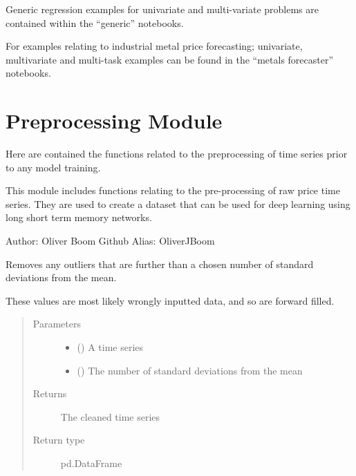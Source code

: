 \documentclass[letterpaper,10pt,english]{sphinxmanual}
\begin{document}
Generic regression examples for univariate and multi-variate problems are contained within the “generic” notebooks.

For examples relating to industrial metal price forecasting; univariate, multivariate and multi-task examples can be found in the “metals forecaster” notebooks.


\section{Preprocessing Module}
\label{\detokenize{preprocessing:preprocessing-module}}\label{\detokenize{preprocessing::doc}}
Here are contained the functions related to the preprocessing of time series prior to any model training.

\label{\detokenize{preprocessing:module-Foresight.preprocessing}}
This module includes functions relating to the pre-processing of raw price
time series. They are used to create a dataset that can be used for deep
learning using long short term memory networks.

Author: Oliver Boom
Github Alias: OliverJBoom

\begin{fulllineitems}
\label{\detokenize{preprocessing:Foresight.preprocessing.clean_data}}
Removes any outliers that are further than a chosen
number of standard deviations from the mean.

These values are most likely wrongly inputted data,
and so are forward filled.
\begin{quote}\begin{description}
\item[{Parameters}] \leavevmode\begin{itemize}
\item {} 
 () \textendash{} A time series

\item {} 
 () \textendash{} The number of standard deviations from the mean

\end{itemize}

\item[{Returns}] \leavevmode
The cleaned time series

\item[{Return type}] \leavevmode
pd.DataFrame

\end{description}\end{quote}

\end{fulllineitems}
\end{document}

